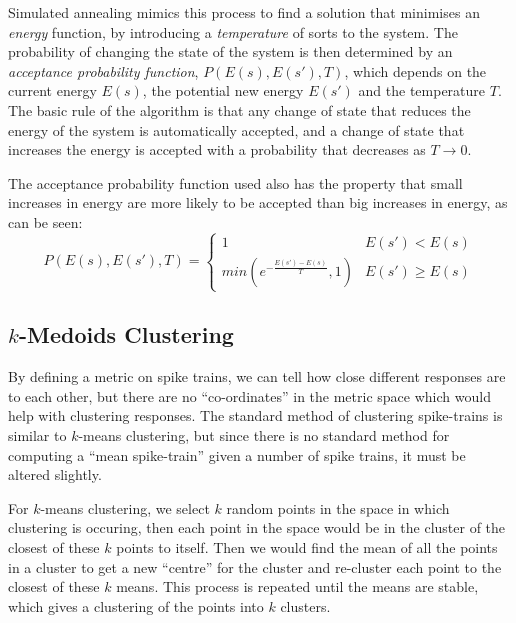 Simulated annealing mimics this process to find a solution that minimises an \emph{energy} function, by introducing a \emph{temperature} of sorts to the system. The probability of changing the state of the system is then determined by an \emph{acceptance probability function}, $P(E(s),E(s'),T)$, which depends on the current energy $E(s)$, the potential new energy $E(s')$ and the temperature $T$.  The basic rule of the algorithm is that any change of state that reduces the energy of the system is automatically accepted, and a change of state that increases the energy is accepted with a probability that decreases as $T\rightarrow0$.

The acceptance probability function used also has the property that small increases in energy are more likely to be accepted than big increases in energy, as can be seen:
\begin{equation}
P(E(s),E(s'),T) = \left\{ \begin{array}{ll} 1 & E(s')<E(s) \\ min(e^{-\frac{E(s')-E(s)}{T}},1) & E(s') \geq E(s) \end{array} \right.
\end{equation}





\subsection{$k$-Medoids Clustering}

By defining a metric on spike trains, we can tell how close different responses 
are to each other, but there are no ``co-ordinates'' in the metric space which 
would help with clustering responses.  The standard method of clustering 
spike-trains is similar to $k$-means clustering, but since there is no standard 
method for computing a ``mean spike-train'' given a number of spike trains, it 
must be altered slightly.

For $k$-means clustering, we select $k$ random points in the space in which 
clustering is occuring, then each point in the space would be in the cluster of 
the closest of these $k$ points to itself.  Then we would find the mean of all 
the points in a cluster to get a new ``centre'' for the cluster and re-cluster 
each point to the closest of these $k$ means.  This process is repeated until 
the means are stable, which gives a clustering of the points into $k$ clusters.

